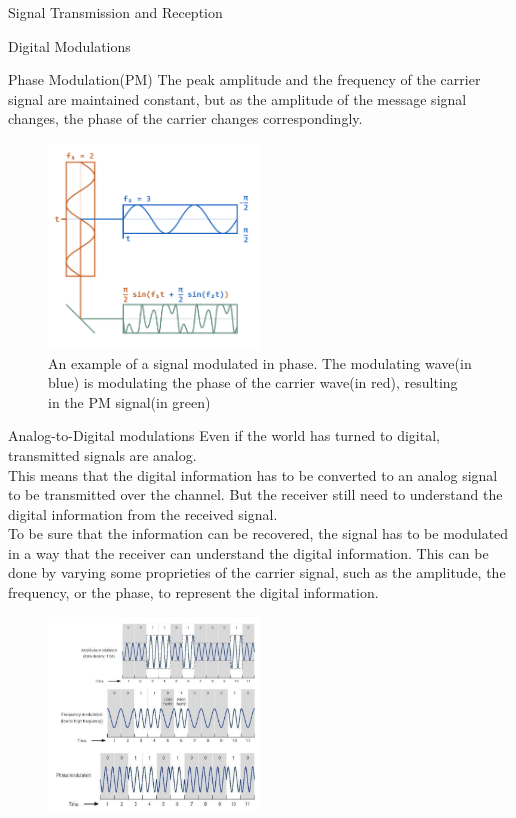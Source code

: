 \begin{section}{Signal Transmission and Reception}
\begin{subsection}{Digital Modulations}
\begin{subsubsection}{Phase Modulation(PM)}
      The peak amplitude and the frequency of the carrier signal are maintained constant, but as 
      the amplitude of the message signal changes, the phase of the carrier changes 
      correspondingly.\\
      \begin{figure}[h]
        \centering
        \includegraphics[width=0.5\textwidth]{img/PM.png}
        \caption{An example of a signal modulated in phase. The modulating wave(in blue) is modulating
          the phase of the carrier wave(in red), resulting in the PM signal(in green)}
        \label{fig:PM}
      \end{figure}
    \end{subsubsection}
    \begin{subsubsection}{Analog-to-Digital modulations}
      Even if the world has turned to digital, transmitted signals are analog.\\
      This means that the digital information has to be converted to an analog signal to be
      transmitted over the channel. But the receiver still need to understand the digital information
      from the received signal.\\
      To be sure that the information can be recovered, the signal has to be modulated in a way that
      the receiver can understand the digital information. This can be done by varying some proprieties
      of the carrier signal, such as the amplitude, the frequency, or the phase, to represent the
      digital information.\\
      \begin{figure}[h]
        \centering
        \includegraphics[width=0.5\textwidth]{img/modulation encoding.png}

\end{figure}
\end{subsubsection}
\end{subsection}
\end{section}
